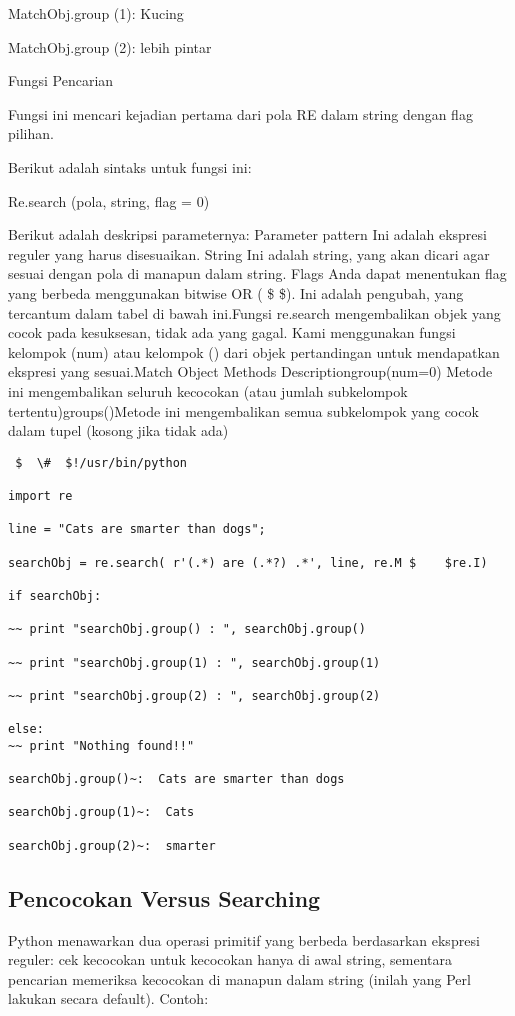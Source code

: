 \begin{enumerate}
\begin{enumerate}
MatchObj.group (1): Kucing

MatchObj.group (2): lebih pintar

Fungsi Pencarian

Fungsi ini mencari kejadian pertama dari pola RE dalam string dengan flag pilihan.

Berikut adalah sintaks untuk fungsi ini:

Re.search (pola, string, flag = 0)

Berikut adalah deskripsi parameternya:
Parameter pattern Ini adalah ekspresi reguler yang harus disesuaikan. String Ini adalah string, yang akan dicari agar sesuai dengan pola di manapun dalam string. Flags Anda dapat menentukan flag yang berbeda menggunakan bitwise OR ( \$    \$). Ini adalah pengubah, yang tercantum dalam tabel di bawah ini.Fungsi re.search mengembalikan objek yang cocok pada kesuksesan, tidak ada yang gagal. Kami menggunakan fungsi kelompok (num) atau kelompok () dari objek pertandingan untuk mendapatkan ekspresi yang sesuai.Match Object Methods Descriptiongroup(num=0) Metode ini mengembalikan seluruh kecocokan (atau jumlah subkelompok tertentu)groups()Metode ini mengembalikan semua subkelompok yang cocok dalam tupel (kosong jika tidak ada)

\begin{verbatim}
 $  \#  $!/usr/bin/python

import re

line = "Cats are smarter than dogs";

searchObj = re.search( r'(.*) are (.*?) .*', line, re.M $    $re.I)

if searchObj:

~~ print "searchObj.group() : ", searchObj.group()

~~ print "searchObj.group(1) : ", searchObj.group(1)

~~ print "searchObj.group(2) : ", searchObj.group(2)

else:
~~ print "Nothing found!!"

searchObj.group()~:  Cats are smarter than dogs

searchObj.group(1)~:  Cats

searchObj.group(2)~:  smarter
\end{verbatim}

\subsection{Pencocokan Versus Searching}
Python menawarkan dua operasi primitif yang berbeda berdasarkan ekspresi reguler: cek kecocokan untuk kecocokan hanya di awal string, sementara pencarian memeriksa kecocokan di manapun dalam string (inilah yang Perl lakukan secara default).
Contoh:


\end{enumerate}
\end{enumerate}
